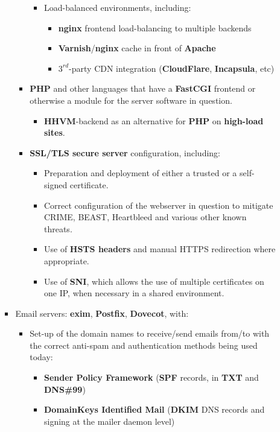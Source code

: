 \documentclass[11pt,a4paper]{article}
\begin{document}
\begin{itemize}
\begin{itemize}
\begin{itemize}
\begin{itemize}
\begin{itemize}
					\item	Load-balanced environments, including:
						\begin{itemize}
						\item	\textbf{nginx} frontend load-balancing to multiple backends
						\item	\textbf{Varnish}/\textbf{nginx} cache in front of \textbf{Apache}
						\item	$3^{rd}$-party CDN integration (\textbf{CloudFlare}, \textbf{Incapsula}, etc)
						\end{itemize}
					\end{itemize}
				\item	\textbf{PHP} and other languages that have a \textbf{FastCGI} frontend or otherwise a module for the server software in question.
					\begin{itemize}
					\item	\textbf{HHVM}-backend as an alternative for \textbf{PHP} on \textbf{high-load sites}.
					\end{itemize}
				\item	\textbf{SSL/TLS secure server} configuration, including:
					\begin{itemize}
					\item	Preparation and deployment of either a trusted or a self-signed certificate.
					\item	Correct configuration of the webserver in question to mitigate CRIME, BEAST, Heartbleed and various other known threats.
					\item	Use of \textbf{HSTS headers} and manual HTTPS redirection where appropriate.
					\item	Use of \textbf{SNI}, which allows the use of multiple certificates on one IP, when necessary in a shared environment.
					\end{itemize}
				\end{itemize}
			\item	Email servers: \textbf{exim}, \textbf{Postfix}, \textbf{Dovecot}, with:
				\begin{itemize}
				\item	Set-up of the domain names to receive/send emails from/to with the correct anti-spam and authentication methods being used today:
					\begin{itemize}
					\item	\textbf{Sender Policy Framework} (\textbf{SPF} records, in \textbf{TXT} and \textbf{DNS\#99})
					\item	\textbf{DomainKeys Identified Mail} (\textbf{DKIM} DNS records and signing at the mailer daemon level)

\end{itemize}
\end{itemize}
\end{itemize}
\end{itemize}
\end{itemize}
\end{document}
